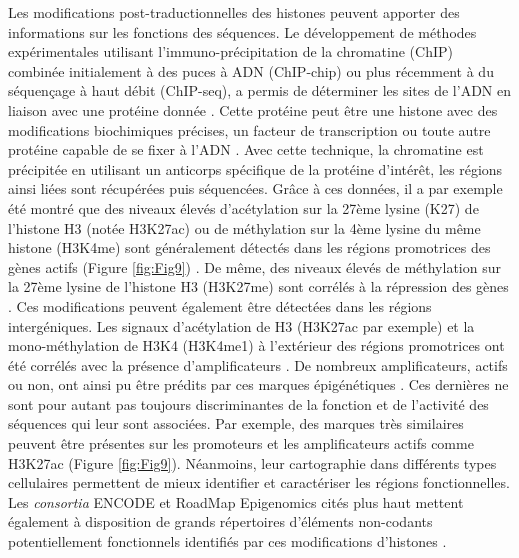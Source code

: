 Les modifications post-traductionnelles des histones peuvent apporter des informations sur les fonctions des séquences. Le développement de méthodes expérimentales utilisant l’immuno-précipitation de la chromatine (ChIP) combinée initialement à des puces à ADN (ChIP-chip) ou plus récemment à du séquençage à haut débit (\acrshort{ChIP-seq}), a permis de déterminer les sites de l’ADN en liaison avec une protéine donnée \citep{ren_genome-wide_2000, barski_high-resolution_2007}. Cette protéine peut être une histone avec des modifications biochimiques précises, un facteur de transcription ou toute autre protéine capable de se fixer à l’ADN \citep{visel_chip-seq_2009}. Avec cette technique, la chromatine est précipitée en utilisant un anticorps spécifique de la protéine d’intérêt, les régions ainsi liées sont récupérées puis séquencées. Grâce à ces données, il a par exemple été montré que des niveaux élevés d'acétylation sur la 27ème lysine (K27) de l’histone H3 (notée H3K27ac) ou de méthylation sur la 4ème lysine du même histone (H3K4me) sont généralement détectés dans les régions promotrices des gènes actifs (Figure \ref{fig:Fig9})  \citep{bernstein_genomic_2005}. De même, des niveaux élevés de méthylation sur la 27ème lysine de l’histone H3 (H3K27me) sont corrélés à la répression des gènes \citep{lee_control_2006}. Ces modifications peuvent également être détectées dans les régions intergéniques. Les signaux d'acétylation de H3 (H3K27ac par exemple) et la mono-méthylation de H3K4 (H3K4me1) à l'extérieur des régions promotrices ont été corrélés avec la présence d’\glspl{amplificateur} \citep{heintzman_distinct_2007}. De nombreux \glspl{amplificateur}, actifs ou non, ont ainsi pu être prédits par ces marques épigénétiques \citep{creyghton_histone_2010}. Ces dernières ne sont pour autant pas toujours discriminantes de la fonction et de l’activité des séquences qui leur sont associées. Par exemple, des marques très similaires peuvent être présentes sur les promoteurs et les \glspl{amplificateur} actifs comme H3K27ac (Figure \ref{fig:Fig9}). Néanmoins, leur cartographie dans différents types cellulaires permettent de mieux identifier et caractériser les régions fonctionnelles. Les \textit{consortia} ENCODE et RoadMap Epigenomics cités plus haut mettent également à disposition de grands répertoires d’éléments non-codants potentiellement fonctionnels identifiés par ces modifications d’histones \citep{davis_encyclopedia_2018, roadmap_epigenomics_consortium_integrative_2015}.

